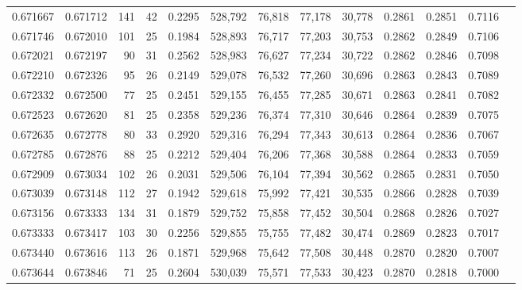 \begin{tabular}{rrrrrrrrrrrrr}
0.671667 & 0.671712 &    141 &    42 &                                     0.2295 & 528,792 &  76,818 &  77,178 &  30,778 & 0.2861 & 0.2851 & 0.7116 \\
0.671746 & 0.672010 &    101 &    25 &                                     0.1984 & 528,893 &  76,717 &  77,203 &  30,753 & 0.2862 & 0.2849 & 0.7106 \\
0.672021 & 0.672197 &     90 &    31 &                                     0.2562 & 528,983 &  76,627 &  77,234 &  30,722 & 0.2862 & 0.2846 & 0.7098 \\
0.672210 & 0.672326 &     95 &    26 &                                     0.2149 & 529,078 &  76,532 &  77,260 &  30,696 & 0.2863 & 0.2843 & 0.7089 \\
0.672332 & 0.672500 &     77 &    25 &                                     0.2451 & 529,155 &  76,455 &  77,285 &  30,671 & 0.2863 & 0.2841 & 0.7082 \\
0.672523 & 0.672620 &     81 &    25 &                                     0.2358 & 529,236 &  76,374 &  77,310 &  30,646 & 0.2864 & 0.2839 & 0.7075 \\
0.672635 & 0.672778 &     80 &    33 &                                     0.2920 & 529,316 &  76,294 &  77,343 &  30,613 & 0.2864 & 0.2836 & 0.7067 \\
0.672785 & 0.672876 &     88 &    25 &                                     0.2212 & 529,404 &  76,206 &  77,368 &  30,588 & 0.2864 & 0.2833 & 0.7059 \\
0.672909 & 0.673034 &    102 &    26 &                                     0.2031 & 529,506 &  76,104 &  77,394 &  30,562 & 0.2865 & 0.2831 & 0.7050 \\
0.673039 & 0.673148 &    112 &    27 &                                     0.1942 & 529,618 &  75,992 &  77,421 &  30,535 & 0.2866 & 0.2828 & 0.7039 \\
0.673156 & 0.673333 &    134 &    31 &                                     0.1879 & 529,752 &  75,858 &  77,452 &  30,504 & 0.2868 & 0.2826 & 0.7027 \\
0.673333 & 0.673417 &    103 &    30 &                                     0.2256 & 529,855 &  75,755 &  77,482 &  30,474 & 0.2869 & 0.2823 & 0.7017 \\
0.673440 & 0.673616 &    113 &    26 &                                     0.1871 & 529,968 &  75,642 &  77,508 &  30,448 & 0.2870 & 0.2820 & 0.7007 \\
0.673644 & 0.673846 &     71 &    25 &                                     0.2604 & 530,039 &  75,571 &  77,533 &  30,423 & 0.2870 & 0.2818 & 0.7000 \\

\end{tabular}
